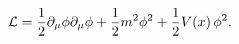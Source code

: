 \begin{equation}
{\cal L}=\frac{1}{2} \partial_\mu \phi \partial_\mu \phi + \frac{1}{2}
m^2 \phi^2 +\frac{1}{2} V(x)\, \phi^2. \label{1.1}
\end{equation}

